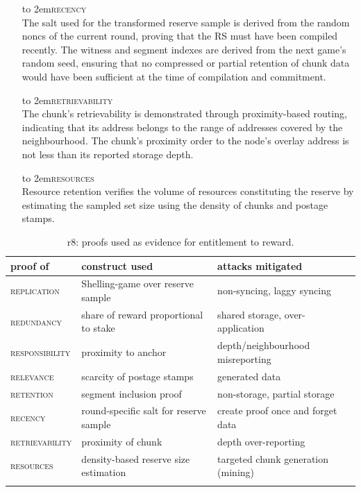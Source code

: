 \begin{itemize}[noitemsep]
\item[\hbox to 2em{\textsc{recency}}] \hspace{1cm}\\ The salt used for the transformed reserve sample is derived from the random noncs of the current round, proving that the RS must have been compiled recently. The witness and segment indexes are derived from the next game's random seed, ensuring that no compressed or partial retention of chunk data would have been
sufficient at the time of compilation and commitment.
\item[\hbox to 2em{\textsc{retrievability}}] \hspace{1cm}\\  The chunk's retrievability is demonstrated through proximity-based routing, indicating that its address belongs to the range of addresses covered by the neighbourhood. The chunk's proximity order to the node's overlay address is not less than its reported storage depth. 
\item[\hbox to 2em{\textsc{resources}}] \hspace{1cm}\\ Resource retention verifies the volume of resources constituting the reserve by estimating the sampled set size using the density of chunks and postage stamps. 
\end{itemize}


{\small \begin{longtable}{l|p{}|p{}}
\toprule
 {proof of} & {construct used} & {attacks mitigated}\\\midrule
 \textsc{replication}& Shelling-game over reserve sample& non-syncing, laggy syncing\\
 \textsc{redundancy}& share of reward proportional to stake & shared storage, over-application\\
 \textsc{responsibility}& proximity to anchor & depth/neighbourhood misreporting \\
 \textsc{relevance}& scarcity of postage stamps & generated data \\
 \textsc{retention}& segment inclusion proof & non-storage, partial storage\\
 \textsc{recency}& round-specific salt for reserve sample & create proof once and forget data\\
 \textsc{retrievability}& proximity of chunk & depth over-reporting\\ 
 \textsc{resources}& density-based reserve size estimation & targeted chunk generation (mining) \\\bottomrule
  \caption[r8: proofs used as evidence for entitlement to reward]{r8: proofs used as evidence for entitlement to reward.}
\label{tab:gr8}
 \end{longtable}
 }


